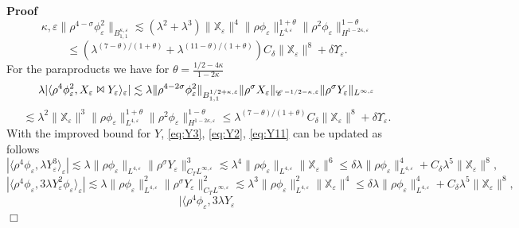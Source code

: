 \documentclass[a4paper,11pt]{article}
\newenvironment{proof}{\noindent\textbf{Proof\ }}{\hspace*{\fill}$\Box$\medskip}
\numberwithin{equation}{section}
\begin{document}
\begin{proof}
\[{{     \kappa, \varepsilon}} \| \rho^{4 - \sigma} \phi_{\varepsilon}^2
     \|_{B^{\kappa, \varepsilon}_{1, 1}} \lesssim (\lambda^2 + \lambda^3) \|
     \mathbb{X}_{\varepsilon} \|^4 \| \rho \phi_{\varepsilon} \|^{1 +
     \theta}_{L^{4, \varepsilon}} \| \rho^2 \phi_{\varepsilon} \|_{H^{1 - 2
     \kappa, \varepsilon}}^{1 - \theta} \]
  \[ \leqslant (\lambda^{(7 - \theta) / (1 + \theta)} + \lambda^{(11 - \theta)
     / (1 + \theta)}) C_{\delta} \| \mathbb{X}_{\varepsilon} \|^8 + \delta
     \Upsilon_{\varepsilon} . \]
  For the paraproducts we have for $\theta = \frac{1 / 2 - 4 \kappa}{1 - 2
  \kappa}$
  \[ \lambda | \langle \rho^4 \phi_{\varepsilon}^2, X_{\varepsilon} \Join
     Y_{\varepsilon} \rangle_{\varepsilon} | \lesssim \lambda \| \rho^{4 - 2
     \sigma} \phi_{\varepsilon}^2 \|_{B^{1 / 2 + \kappa, \varepsilon}_{1, 1}}
     \| \rho^{\sigma} X_{\varepsilon} \|_{\mathscr{C} \hspace{.1em}^{- 1 / 2 -
     \kappa, \varepsilon}} \| \rho^{\sigma} Y_{\varepsilon} \|_{L^{\infty,
     \varepsilon}} \]
  \[ \lesssim \lambda^2 \| \mathbb{X}_{\varepsilon} \|^3 \| \rho
     \phi_{\varepsilon} \|^{1 + \theta}_{L^{4, \varepsilon}} \| \rho^2
     \phi_{\varepsilon} \|^{1 - \theta}_{H^{1 - 2 \kappa, \varepsilon}}
     \leqslant \lambda^{(7 - \theta) / (1 + \theta)} C_{\delta} \|
     \mathbb{X}_{\varepsilon} \|^8 + \delta \Upsilon_{\varepsilon} . \]
  With the improved bound for $Y$, {\eqref{eq:Y3}}, {\eqref{eq:Y2}}, {\eqref{eq:Y11}}
  can be updated as follows
  \[ | \langle \rho^4 \phi_{\varepsilon}, \lambda Y_{\varepsilon}^3
     \rangle_{\varepsilon} | \lesssim \lambda \| \rho \phi_{\varepsilon}
     \|_{L^{4, \varepsilon}} \| \rho^{\sigma} Y_{\varepsilon} \|_{C_T
     L^{\infty, \varepsilon}}^3 \lesssim \lambda^4 \| \rho \phi_{\varepsilon}
     \|_{L^{4, \varepsilon}} \| \mathbb{X}_{\varepsilon} \|^6 \leqslant \delta
     \lambda \| \rho \phi_{\varepsilon} \|_{L^{4, \varepsilon}}^4 + C_{\delta}
     \lambda^5 \| \mathbb{X}_{\varepsilon} \|^8, \]
  \[ | \langle \rho^4 \phi_{\varepsilon}, 3 \lambda Y_{\varepsilon}^2
     \phi_{\varepsilon} \rangle_{\varepsilon} | \lesssim \lambda \| \rho
     \phi_{\varepsilon} \|_{L^{4, \varepsilon}}^2 \| \rho^{\sigma}
     Y_{\varepsilon} \|_{C_T L^{\infty, \varepsilon}}^2 \lesssim \lambda^3 \|
     \rho \phi_{\varepsilon} \|_{L^{4, \varepsilon}}^2 \|
     \mathbb{X}_{\varepsilon} \|^4 \leqslant \delta \lambda \| \rho
     \phi_{\varepsilon} \|_{L^{4, \varepsilon}}^4 + C_{\delta} \lambda^5 \|
     \mathbb{X}_{\varepsilon} \|^8, \]
  \[ | \langle \rho^4 \phi_{\varepsilon}, 3 \lambda Y_{\varepsilon}
\]
\end{proof}
\end{document}
